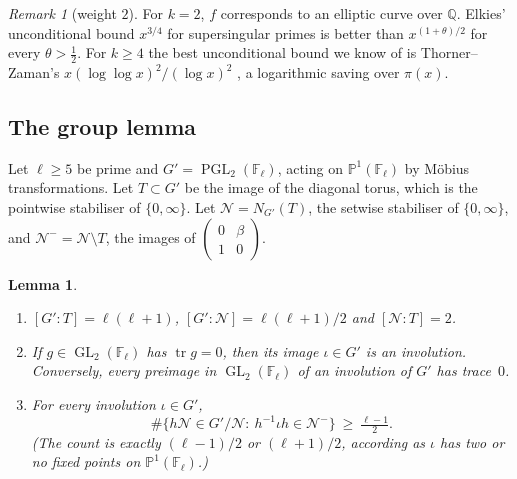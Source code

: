 \documentclass[11pt]{amsart}
\newtheorem{lemma}[theorem]{Lemma}
\theoremstyle{definition}
\theoremstyle{remark}
\newtheorem{remark}[theorem]{Remark}
\newcommand{\Q}{\mathbb{Q}}
\newcommand{\F}{\mathbb{F}}
\newcommand{\PP}{\mathbb{P}}
\DeclareMathOperator{\GL}{GL}
\DeclareMathOperator{\PGL}{PGL}
\DeclareMathOperator{\tr}{tr}
\newcommand{\Nor}{\mathcal{N}}     %
\newcommand{\Nout}{\Nor^{-}}
\begin{document}
\begin{remark}[weight $2$]
For $k=2$, $f$ corresponds to an elliptic curve over $\Q$. Elkies' unconditional bound $x^{3/4}$ \cite{Elk87,Elk91}
for supersingular primes is better than $x^{(1+\theta)/2}$ for every $\theta>\frac12$. For $k\ge4$ the best
unconditional bound we know of is Thorner--Zaman's $x(\log\log x)^2/(\log x)^2$ \cite[Thm.~1.4]{TZ}, a logarithmic
saving over $\pi(x)$.
\end{remark}

\subsection{The group lemma}

Let $\ell\ge5$ be prime and $G'=\PGL_2(\F_\ell)$, acting on $\PP^1(\F_\ell)$ by M\"obius transformations. Let
$T\subset G'$ be the image of the diagonal torus, which is the pointwise stabiliser of $\{0,\infty\}$. Let
$\Nor=N_{G'}(T)$, the setwise stabiliser of $\{0,\infty\}$, and $\Nout=\Nor\setminus T$, the images of
$\left(\begin{smallmatrix}0&\beta\\1&0\end{smallmatrix}\right)$.

\begin{lemma}\label{lem:group}
\begin{enumerate}[label=(\alph*)]
\item $[G':T]=\ell(\ell+1)$, $[G':\Nor]=\ell(\ell+1)/2$ and $[\Nor:T]=2$.
\item If $g\in\GL_2(\F_\ell)$ has $\tr g=0$, then its image $\iota\in G'$ is an involution. Conversely, every
  preimage in $\GL_2(\F_\ell)$ of an involution of $G'$ has trace~$0$.
\item For every involution $\iota\in G'$,
  \[\#\{h\Nor\in G'/\Nor:\ h^{-1}\iota h\in \Nout\}\ \ge\ \tfrac{\ell-1}{2}.\]
  (The count is exactly $(\ell-1)/2$ or $(\ell+1)/2$, according as $\iota$ has two or no fixed points on
  $\PP^1(\F_\ell)$.)
\end{enumerate}
\end{lemma}
\end{document}
